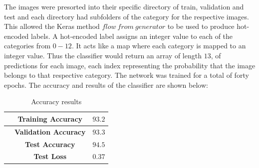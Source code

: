 \documentclass[11pt]{article}
\begin{document}
\noindent The images were presorted into their specific directory of train, validation and test and each directory had subfolders of the category for the respective images. This allowed the Keras method $flow \ from \ generator$ to be used to produce hot-encoded labels. A hot-encoded label assigns an integer value to each of the categories from $0-12$. It acts like a map where each category is mapped to an integer value. Thus the classifier would return an array of length $13$, of predictions for each image, each index representing the probability that the image belongs to that respective category. The network was trained for a total of forty epochs. The accuracy and results of the classifier are shown below:
\begin{table}[H]
\begin{center}
	
		\begin{tabular}{||c c c ||}
			\hline
			& \textbf{Training Accuracy} & $93.2$\\
			\hline
			& \textbf{Validation Accuracy} & $93.3$\\
			\hline
			&\textbf{Test Accuracy} & $94.5$\\
			\hline
			& \textbf{Test Loss} & $0.37$\\	
			\hline
	
		\end{tabular}	
		\caption{Accuracy results}
	
\end{center}
\end{table}
\end{document}
